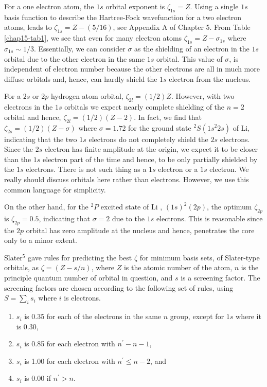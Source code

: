 For a one electron atom, the $1s$ orbital exponent is $\zeta_{1s} =
Z$.  Using a single $1s$ basis function to describe the Hartree-Fock
wavefunction for a two electron atoms, leads to $\zeta_{1s} = Z - (5
/16)$, see Appendix A of Chapter 5.  From Table \ref{chap15-tab1}, we
see that even for many electron atoms $\zeta_{1s} = Z - \sigma_{1s}$
where $\sigma_{1s} \sim 1/3$.  Essentially, we can consider $\sigma$
as the shielding of an electron in the $1s$ orbital due to the other
electron in the same $1s$ orbital.  This value of $\sigma$, is
independent of electron number because the other electrons are all in
much more diffuse orbitals and, hence, can hardly shield the $1s$
electron from the nucleus.

For a $2s$ or $2p$ hydrogen atom orbital, $\zeta_{2l} = (1/2)Z$.
However, with two electrons in the $1s$ orbitals we expect nearly complete 
shielding of the $n = 2$ orbital and hence, $\zeta_{2l} = (1/2)(Z-2)$.
In fact, we find that $\zeta_{2s} = (1/2)(Z-\sigma)$ where $\sigma = 
1.72$ for the ground state $^2S(1s^2 2s)$ of Li, indicating that the
two $1s$ electrons do not completely shield the $2s$ electrons.  Since 
the $2s$ electron has finite amplitude at the origin, we expect it to 
be closer than the $1s$  electron part of the time and hence, to be 
only partially shielded by the $1s$ electrons.  There is not such thing 
as a $1s$ electron or a $1s$ electron. We really should discuss
orbitals here rather than electrons.  However, we use this common language 
for simplicity.

On the other hand, for the $^2P$ excited state of Li , $(1s)^2(2p)$, the optimum 
$\zeta_{2p}$ is $\zeta_{2p} = 0.5$, indicating that $\sigma = 2$ due to 
the $1s$ electrons.  This is reasonable since the $2p$ orbital
has zero amplitude at the nucleus and hence, penetrates the core only to a 
minor extent.

Slater$^5$ gave rules for predicting the best $\zeta$ for minimum basis 
sets, of Slater-type orbitals, as $\zeta = (Z-s/n)$, where $Z$ 
is the atomic number of the atom, $n$ is the principle quantum number 
of orbital in question, and $s$ is a screening factor.  The screening 
factors are chosen according to the following set of rules, using 
$S = \sum_i s_i$ where $i$ is electrons.
\begin{enumerate}
\item $s_i$ is 0.35 for each of the electrons in the same $n$ 
group, except for $1s$ where it is 0.30,

\item $s_i$ is 0.85 for each electron with $n^{\prime} - n - 1$,

\item $s_i$ is 1.00 for each electron with $n^{\prime} \leq 
n-2$, and

\item $s_i$ is 0.00 if $n^{\prime} > n$.
\end{enumerate}

